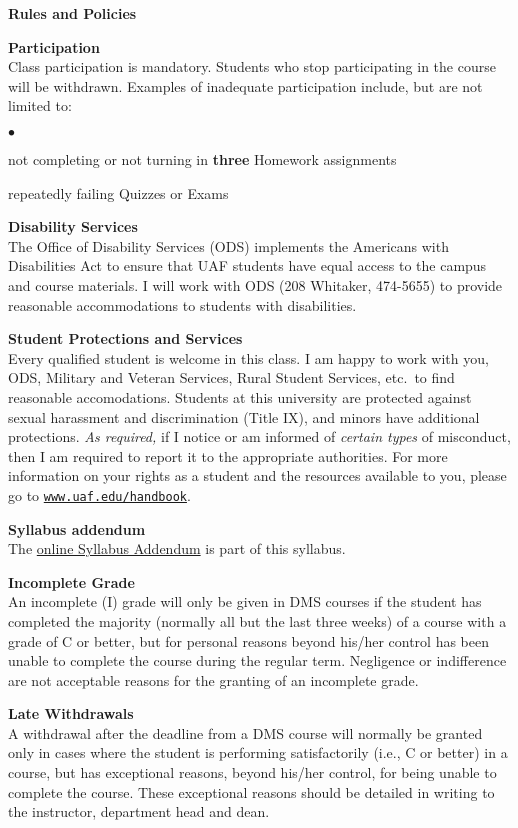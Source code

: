 \documentclass[12pt]{article}
\renewcommand{\emph}[1]{\textsf{\textbf{#1}}}
\newcommand{\localhead}[1]{\par\smallskip\textbf{#1}\nobreak\\}%
\def\heading#1{\localhead{\large\emph{#1}}}
\def\subheading#1{\localhead{\emph{#1}}}
\newenvironment{clist}%
{\bgroup\parskip 0pt\begin{list}{$\bullet$}{\partopsep 4pt\topsep 0pt\itemsep -2pt}}%
{\end{list}\egroup}%
\begin{document}
\bigskip
\heading{Rules and Policies}
\vskip -15pt
\subheading{Participation}
Class participation is mandatory.  Students who stop participating in the course will be withdrawn.  Examples of inadequate participation include, but are not limited to:

\begin{clist}
\item not completing or not turning in \textbf{three} Homework assignments
\item repeatedly failing Quizzes or Exams
\end{clist}

\subheading{Disability Services}
The Office of Disability Services (ODS) implements the Americans with Disabilities Act to ensure that UAF students have equal access to the campus and course materials.  I will work with ODS (208 Whitaker, 474-5655) to provide reasonable accommodations to students with disabilities.

\subheading{Student Protections and Services}
Every qualified student is welcome in this class.  I am happy to work with you, ODS, Military and Veteran Services, Rural Student Services, etc.~to find reasonable accomodations.  Students at this university are protected against sexual harassment and discrimination (Title IX), and minors have additional protections. \textit{As required,} if I notice or am informed of \textit{certain types} of misconduct, then I am required to report it to the appropriate authorities.  For more information on your rights as a student and the resources available to you, please go to \href{https://www.uaf.edu/handbook/}{\texttt{www.uaf.edu/handbook}}.

\subheading{Syllabus addendum}
The \href{https://drive.google.com/file/d/1dzZNW-DiD47BXhCc8_a6rbMGjvII53RI/view?usp=sharing}{online Syllabus Addendum} is part of this syllabus.

\subheading{Incomplete Grade} 
An incomplete (I) grade will only be given in DMS courses if the student has completed the majority (normally all but the last three weeks) of a course with a grade of C or better, but for personal reasons beyond his/her control has been unable to complete the course during the regular term. Negligence or indifference are not acceptable reasons for the granting of an incomplete grade. 

\subheading{Late Withdrawals} 
A withdrawal after the deadline from a DMS course will normally be granted only in cases where the student is performing satisfactorily (i.e., C or better) in a course, but has exceptional reasons, beyond his/her control, for being unable to complete the course. These exceptional reasons should be detailed in writing to the instructor, department head and dean.
\end{document}
